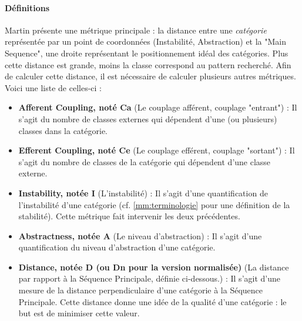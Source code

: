 \documentclass{scrartcl}
\begin{document}
    \paragraph{Définitions}Martin présente une métrique principale : la distance entre une \textit{catégorie} représentée par un point de coordonnées (Instabilité, Abstraction) et la "Main Sequence", une droite représentant le positionnement idéal des catégories. Plus cette distance est grande, moins la classe correspond au pattern recherché. Afin de calculer cette distance, il est nécessaire de calculer plusieurs autres métriques. Voici une liste de celles-ci :
    \begin{itemize}
        \item \textbf{Afferent Coupling, noté Ca} (Le couplage afférent, couplage "entrant") : Il s'agit du nombre de classes externes qui dépendent d'une (ou plusieurs) classes dans la catégorie.
        \item \textbf{Efferent Coupling, noté Ce} (Le couplage efférent, couplage "sortant") : Il s'agit du nombre de classes de la catégorie qui dépendent d'une classe externe.
        \item \textbf{Instability, notée I} (L'instabilité) : Il s'agit d'une quantification de l'instabilité d'une catégorie (cf. \ref{mm:terminologie} pour une définition de la stabilité). Cette métrique fait intervenir les deux précédentes.
        \item \textbf{Abstractness, notée A} (Le niveau d'abstraction) : Il s'agit d'une quantification du niveau d'abstraction d'une catégorie.
        \item \textbf{Distance, notée D (ou Dn pour la version normalisée)} (La distance par rapport à la Séquence Principale, définie ci-dessous.) : Il s'agit d'une mesure de la distance perpendiculaire d'une catégorie à la Séquence Principale. Cette distance donne une idée de la qualité d'une catégorie : le but est de minimiser cette valeur.
    \end{itemize}
\end{document}
